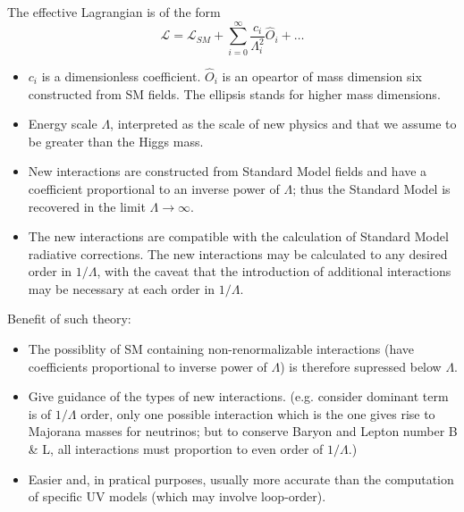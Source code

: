 \documentclass[8pt]{beamer}
\newcommand{\lag}{\mathcal{L}}
\begin{document}
\begin{frame}
  The effective Lagrangian is of the form
  $$\lag=\lag_{SM}+\sum_{i=0}^{\infty}\frac{c_i}{\Lambda_i^2}\hat O_i+\dots$$
  \begin{itemize}
  \item $c_i$ is a dimensionless coefficient. $\hat{O}_i$ is an opeartor of mass dimension six constructed from SM fields. The ellipsis stands for higher mass dimensions.
  \item Energy scale $\Lambda$, interpreted
as the scale of new physics and that we assume to be greater than the Higgs mass.
  \item New
interactions are constructed from Standard Model fields and have a coefficient proportional
to an inverse power of $\Lambda$; thus the Standard Model is recovered in the limit $\Lambda\rightarrow\infty$.
  \item The
new interactions are compatible with the calculation of Standard Model radiative corrections.
The new interactions may be calculated to any desired order in $1/\Lambda$, with the caveat that
the introduction of additional interactions may be necessary at each order in $1/\Lambda$.
  \end{itemize}

\end{frame}
\begin{frame}
  Benefit of such theory:
  \begin{itemize}
	\item The possiblity of SM containing non-renormalizable interactions (have coefficients proportional to inverse power of $\Lambda$) is therefore supressed below $\Lambda$.
	\item Give guidance of the types of new interactions. (e.g. consider dominant term is of $1/\Lambda$ order, only one possible interaction which is the one gives rise to Majorana masses for neutrinos; but to conserve Baryon and Lepton number B \& L, all interactions must proportion to even order of $1/\Lambda$.)
	\item Easier and, in pratical purposes, usually more accurate than the computation of specific UV models (which may involve loop-order).
  \end{itemize}
\end{frame}
\end{document}
